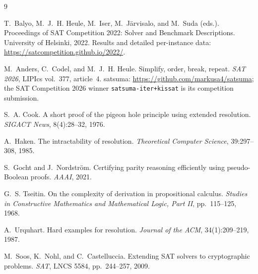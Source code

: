 \documentclass[10pt]{article}
\begin{document}
\begin{thebibliography}{9}
\setlength{\itemsep}{0pt}

 T.~Balyo, M.~J.~H. Heule, M.~Iser, M.~J\"arvisalo, and
  M.~Suda (eds.).
\newblock Proceedings of SAT Competition 2022: Solver and Benchmark
  Descriptions.
\newblock University of Helsinki, 2022. Results and detailed per-instance
  data: \url{https://satcompetition.github.io/2022/}.

 M.~Anders, C.~Codel, and M.~J.~H. Heule.
\newblock Simplify, order, break, repeat.
\newblock \emph{SAT 2026}, LIPIcs vol.~377, article~4. satsuma:
  \url{https://github.com/markusa4/satsuma}; the SAT Competition 2026
  winner \texttt{satsuma-iter+kissat} is its competition submission.

 S.~A. Cook.
\newblock A short proof of the pigeon hole principle using extended
  resolution.
\newblock \emph{SIGACT News}, 8(4):28--32, 1976.

 A.~Haken.
\newblock The intractability of resolution.
\newblock \emph{Theoretical Computer Science}, 39:297--308, 1985.

 S.~Gocht and J.~Nordstr\"om.
\newblock Certifying parity reasoning efficiently using pseudo-Boolean
  proofs.
\newblock \emph{AAAI}, 2021.

 G.~S. Tseitin.
\newblock On the complexity of derivation in propositional calculus.
\newblock \emph{Studies in Constructive Mathematics and Mathematical
  Logic, Part II}, pp.~115--125, 1968.

 A.~Urquhart.
\newblock Hard examples for resolution.
\newblock \emph{Journal of the ACM}, 34(1):209--219, 1987.

 M.~Soos, K.~Nohl, and C.~Castelluccia.
\newblock Extending SAT solvers to cryptographic problems.
\newblock \emph{SAT}, LNCS 5584, pp.~244--257, 2009.

\end{thebibliography}
\end{document}
